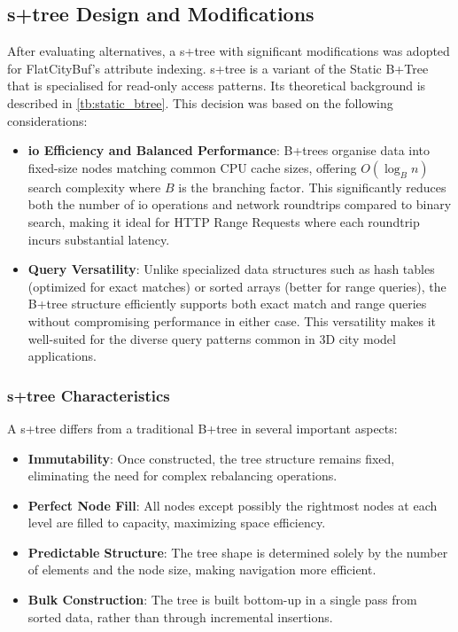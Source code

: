 \subsection{\texorpdfstring{\ac{s+tree}}{S+tree} Design and Modifications}
\label{methodology:attribute_index:static_btree_design}

After evaluating alternatives, a \ac{s+tree} with significant modifications was adopted for FlatCityBuf's attribute indexing. \ac{s+tree} is a variant of the Static B+Tree that is specialised for read-only access patterns. Its theoretical background is described in \autoref{tb:static_btree}. This decision was based on the following considerations:

\begin{itemize}
  \item \textbf{\ac{io} Efficiency and Balanced Performance}: B+trees organise data into fixed-size nodes matching common CPU cache sizes, offering $O(\log_B n)$ search complexity where $B$ is the branching factor. This significantly reduces both the number of \ac{io} operations and network roundtrips compared to binary search, making it ideal for HTTP Range Requests where each roundtrip incurs substantial latency.

  \item \textbf{Query Versatility}: Unlike specialized data structures such as hash tables (optimized for exact matches) or sorted arrays (better for range queries), the B+tree structure efficiently supports both exact match and range queries without compromising performance in either case. This versatility makes it well-suited for the diverse query patterns common in 3D city model applications.
\end{itemize}

\subsubsection{\ac{s+tree} Characteristics}
\label{methodology:attribute_index:static_btree_characteristics}

A \ac{s+tree} differs from a traditional B+tree in several important aspects:

\begin{itemize}
  \item \textbf{Immutability}: Once constructed, the tree structure remains fixed, eliminating the need for complex rebalancing operations.

  \item \textbf{Perfect Node Fill}: All nodes except possibly the rightmost nodes at each level are filled to capacity, maximizing space efficiency.

  \item \textbf{Predictable Structure}: The tree shape is determined solely by the number of elements and the node size, making navigation more efficient.

  \item \textbf{Bulk Construction}: The tree is built bottom-up in a single pass from sorted data, rather than through incremental insertions.
\end{itemize}


